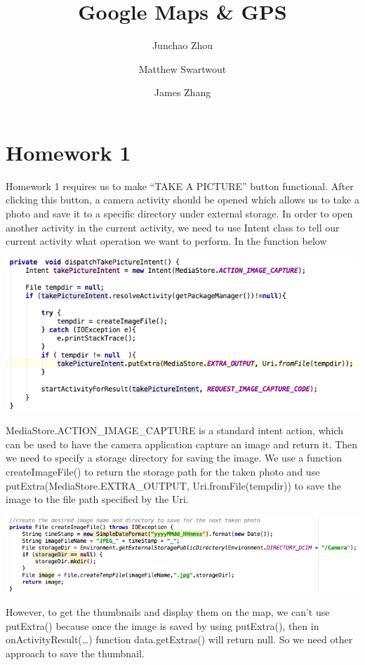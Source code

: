 \documentclass[]{article}
\title{Google Maps \& GPS}
\author{Junchao Zhou \and Matthew Swartwout \and James Zhang }
\begin{document}
\maketitle

\section{Homework 1}
Homework 1 requires us to make “TAKE A PICTURE” button functional. After clicking this button, a camera activity should be opened which allows us to take a photo and save it to a specific directory under external storage. 
In order to open another activity in the current activity, we need to use Intent class to tell our current activity what operation we want to perform. In the function below

\includegraphics[keepaspectratio, width=\textwidth]{codeSnippet1}

MediaStore.ACTION\_IMAGE\_CAPTURE is a standard intent action, which can be used to have the camera application capture an image and return it. Then we need to specify a storage directory for saving the image. We use a function createImageFile() to return the storage path for the taken photo and use putExtra(MediaStore.EXTRA\_OUTPUT, Uri.fromFile(tempdir)) to save the image to the file path specified by the Uri.

\includegraphics[keepaspectratio, width=\textwidth]{codeSnippet2}

However, to get the thumbnails and display them on the map, we can’t use putExtra() because once the image is saved by using putExtra(),  then in onActivityResult(…) function data.getExtras() will return null. So we need other approach to save the thumbnail.
  
\end{document}
